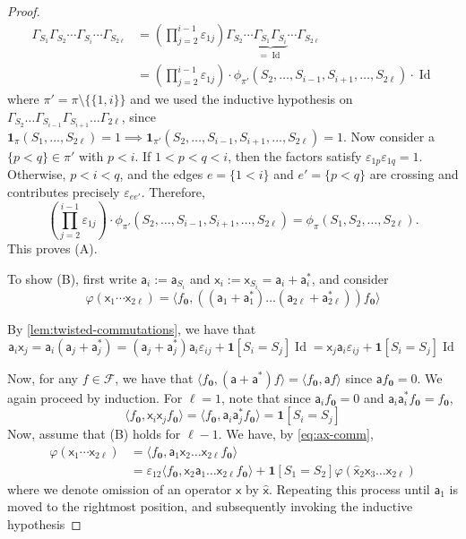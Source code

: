 \documentclass
[11pt,letterpaper]
{article}
\renewcommand{\hat}[1]{\widehat{#1}}
\theoremstyle{definition}
\newcommand{\sfa}{\mathsf a}
\newcommand{\sfx}{\mathsf x}
\newcommand{\vac}{f_{\bm{0}}}
\newcommand{\eps}{\varepsilon}
\newcommand{\cF}{{\mathcal F}}
\newcommand{\1}{\mathbf{1}}
\newcommand{\Id}{\operatorname{Id}}
\begin{document}
\begin{proof}
     \begin{align*}
       \Gamma_{S_1}\Gamma_{S_2}\cdots \Gamma_{S_i} \cdots \Gamma_{S_{2\ell}} &= \left(\prod_{j=2}^{i-1}\eps_{1j}\right)\Gamma_{S_2}\cdots \underbrace{\Gamma_{S_1}\Gamma_{S_i}}_{=\Id} \cdots \Gamma_{S_{2\ell}} \\ 
       &=\left(\prod_{j=2}^{i-1}\eps_{1j}\right) \cdot \phi_{\pi'}(S_2,\ldots, S_{i-1}, S_{i+1}, \ldots, S_{2\ell}) \cdot \Id 
     \end{align*}
     where $\pi' = \pi\setminus \{\{1,i\}\}$ and we used the inductive hypothesis on $\Gamma_{S_2}\dots \Gamma_{S_{i-1}}\Gamma_{S_{i+1}}\dots \Gamma_{2\ell}$, since $\1_\pi(S_1,\dots,S_{2\ell}) =1 \implies \1_{\pi'}(S_2,\dots,S_{i-1}, S_{i+1},\dots, S_{2\ell})=1$. Now consider a $\{p<q\}\in \pi'$ with $p<i$. If $1 < p < q < i$, then the factors satisfy $\eps_{1p}\eps_{1q}=1$. Otherwise, $p < i < q$, and the edges $e=\{1<i\}$ and $e'=\{p < q\}$ are crossing and contributes precisely $\eps_{ee'}$. Therefore, 
     \[
     \left(\prod_{j=2}^{i-1}\eps_{1j}\right) \cdot \phi_{\pi'}(S_2,\ldots, S_{i-1}, S_{i+1}, \ldots, S_{2\ell})  = \phi_{\pi}(S_1,S_2,\ldots, S_{2\ell}).
     \]
     This proves (A).

     
     To show (B), first write $\sfa_i := \sfa_{S_i}$ and $\sfx_i:= \sfx_{S_i} = \sfa_i + \sfa^*_i$, and consider
     \[
     \varphi(\sfx_{1}\cdots \sfx_{{2\ell}}) =   \langle f_{\bm{0}}, \left((\sfa_{1} + \sfa_{1}^*) \dots (\sfa_{{2\ell}} + \sfa_{{2\ell}}^*)\right)f_{\bm{0}}\rangle
     \]
     
     By \cref{lem:twisted-commutations}, we have that 
  \begin{equation}\label{eq:ax-comm}
      \sfa_i \sfx_j = \sfa_i(\sfa_j + \sfa_j^*) = (\sfa_j + \sfa_j^*)\sfa_i\eps_{ij} + \1[S_i=S_j] \Id = \sfx_j \sfa_i \eps_{ij} + \1[S_i=S_j] \Id
  \end{equation}

     Now, for any $f\in \cF$, we have that $\langle f_{\bm{0}}, (\sfa+\sfa^*) f\rangle =\langle f_{\bm{0}}, \sfa f\rangle$ since $\sfa f_{\bm{0}} = 0$. 
     We again proceed by induction. For $\ell=1$, note that since $\sfa_i\vac =0$ and $\sfa_i\sfa_i^*\vac=\vac$,
     \[
     \langle \vac, \sfx_i \sfx_j\vac\rangle = \langle \vac, \sfa_i\sfa_j^*\vac\rangle = \1[S_i=S_j] 
     \]
     Now, assume that (B) holds for $\ell-1$. We have, by \cref{eq:ax-comm},
     \begin{align*}
      \varphi(\sfx_{1}\cdots \sfx_{{2\ell}}) &= \langle \vac, \sfa_1 \sfx_2 \dots \sfx_{2\ell} \vac\rangle \\
        &= \eps_{12} \langle \vac,  \sfx_2 \sfa_1 \dots \sfx_{2\ell} \vac\rangle + \1[S_1=S_2] \varphi(\hat{\sfx}_2\sfx_3 \dots \sfx_{2\ell}) 
     \end{align*}
     where we denote omission of an operator $\sfx$ by $\hat{\sfx}$. Repeating this process until $\sfa_1$ is moved to the rightmost position, and subsequently invoking the inductive hypothesis


\end{proof}
\end{document}
